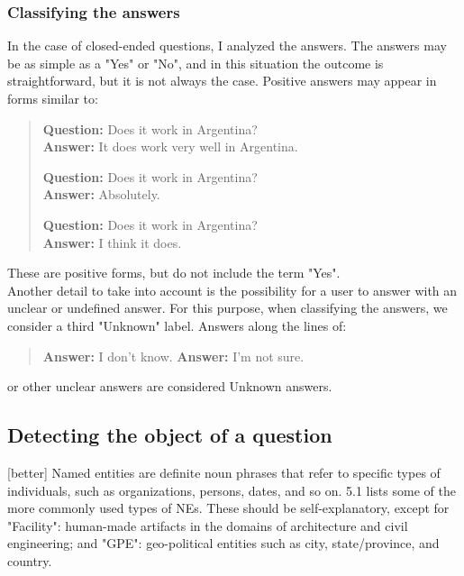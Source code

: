 \documentclass[LaM,binding=0.6cm]{sapthesis}
\begin{document}
\subsubsection{Classifying the answers}
In the case of closed-ended questions, I analyzed the answers.
The answers may be as simple as a "Yes" or "No", and in this situation the outcome is straightforward, but it is not always the case.
Positive answers may appear in forms similar to:
\begin{quote}
\textbf{Question:} Does it work in Argentina? \\
\textbf{Answer:} It does work very well in Argentina.

\textbf{Question:} Does it work in Argentina? \\
\textbf{Answer:} Absolutely.

\textbf{Question:} Does it work in Argentina? \\
\textbf{Answer:} I think it does.
\end{quote}
These are positive forms, but do not include the term "Yes". \\

Another detail to take into account is the possibility for a user to answer with an unclear or undefined answer. For this purpose, when classifying the answers, we consider a third "Unknown" label.
Answers along the lines of:

\begin{quote}
\textbf{Answer:} I don't know.
\textbf{Answer:} I'm not sure.
\end{quote}

or other unclear answers are considered Unknown answers.

\subsection{Detecting the object of a question}
[better]
Named entities are definite noun phrases that refer to specific types of individuals, such as organizations, persons, dates, and so on. 5.1 lists some of the more commonly used types of NEs. These should be self-explanatory, except for "Facility": human-made artifacts in the domains of architecture and civil engineering; and "GPE": geo-political entities such as city, state/province, and country.
\end{document}

